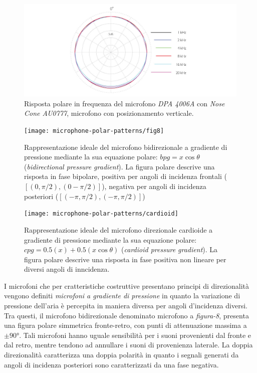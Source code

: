 \begin{refsection}
\begin{figure}[h]
\centering
\includegraphics[width=0.99\columnwidth]{CAPITOLI/1000/IMG/4006A-ddicate-4006A-Omni-Microphone-polar-pattern-nose-cone-veritical.jpg}
\caption[]{Risposta polare in frequenza del microfono \emph{DPA 4006A} con \emph{Nose Cone AU0777}, microfono con posizionamento verticale.}%
\label{pol:dpa4006nose}
\end{figure}

\begin{figure}[t]
\centering
\texttt{[image: microphone-polar-patterns/fig8]}
\caption[]{Rappresentazione ideale del microfono bidirezionale a gradiente di
pressione mediante la sua equazione polare: $bpg = x\cos\theta$
(\emph{bidirectional pressure gradient}). La figura polare descrive una risposta
in fase bipolare, positiva per angoli di incidenza frontali ($[(0,\pi/2),(0-\pi/2)]$),
negativa per angoli di incidenza posteriori ($[(-\pi,\pi/2),(-\pi,\pi/2)]$)}
\label{polar:fig8}
\end{figure}

\begin{figure}[t]
\centering
\texttt{[image: microphone-polar-patterns/cardioid]}
\caption[]{Rappresentazione ideale del microfono direzionale cardioide a gradiente
di pressione mediante la sua equazione polare: $cpg = 0.5(x) + 0.5(x\cos\theta)$
(\emph{cardioid pressure gradient}). La figura polare descrive una risposta in
fase positiva non lineare per diversi angoli di inncidenza.}
\label{polar:cardioid}
\end{figure}

I microfoni che per cratteristiche costruttive presentano principi di direzionalità
vengono definiti \emph{microfoni a gradiente di pressione} in quanto la variazione
di pressione dell'aria è percepita in maniera diversa per angoli d'incidenza diversi.
Tra questi, il microfono bidirezionale denominato microfono a \emph{figura-8},
presenta una figura polare simmetrica fronte-retro, con punti di attenuazione
massima a $\pm90°$. Tali microfoni hanno uguale sensibilità per i suoni
provenienti dal fronte e dal retro, mentre tendono ad annullare i suoni di
provenienza laterale. La doppia direzionalità caratterizza una doppia polarità
in quanto i segnali generati da angoli di incidenza posteriori sono caratterizzati da
una fase negativa.


\end{refsection}

